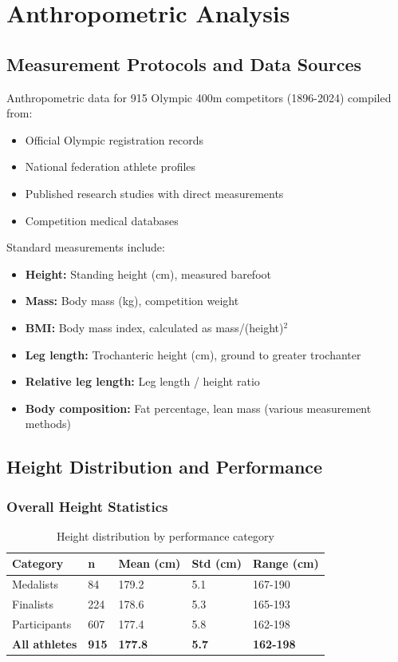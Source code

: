 \section{Anthropometric Analysis}

\subsection{Measurement Protocols and Data Sources}

Anthropometric data for 915 Olympic 400m competitors (1896-2024) compiled from:
\begin{itemize}
    \item Official Olympic registration records
    \item National federation athlete profiles
    \item Published research studies with direct measurements
    \item Competition medical databases
\end{itemize}

Standard measurements include:
\begin{itemize}
    \item \textbf{Height:} Standing height (cm), measured barefoot
    \item \textbf{Mass:} Body mass (kg), competition weight
    \item \textbf{BMI:} Body mass index, calculated as mass/(height)$^2$
    \item \textbf{Leg length:} Trochanteric height (cm), ground to greater trochanter
    \item \textbf{Relative leg length:} Leg length / height ratio
    \item \textbf{Body composition:} Fat percentage, lean mass (various measurement methods)
\end{itemize}

\subsection{Height Distribution and Performance}

\subsubsection{Overall Height Statistics}

\begin{table}[H]
\centering
\caption{Height distribution by performance category}
\begin{tabular}{@{}lllll@{}}
\toprule
\textbf{Category} & \textbf{n} & \textbf{Mean (cm)} & \textbf{Std (cm)} & \textbf{Range (cm)} \\
\midrule
Medalists & 84 & 179.2 & 5.1 & 167-190 \\
Finalists & 224 & 178.6 & 5.3 & 165-193 \\
Participants & 607 & 177.4 & 5.8 & 162-198 \\
\midrule
\textbf{All athletes} & \textbf{915} & \textbf{177.8} & \textbf{5.7} & \textbf{162-198} \\
\bottomrule
\end{tabular}
\end{table}

